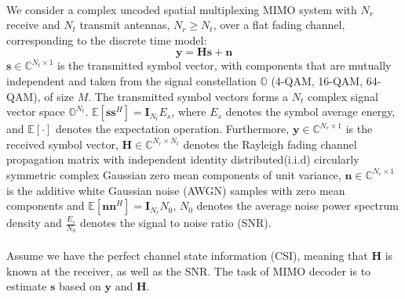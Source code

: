\documentclass[12pt,a4paper,final]{article}
\begin{document}
\begin{spacing}{2.5}
\paragraph{}We consider a complex uncoded spatial multiplexing MIMO system with $N_r$ receive and $N_t$ transmit antennas, $N_{r}\geq N_{t}$, over a flat fading channel, corresponding to the discrete time model:
\begin{equation}
\mathbf{y}=\mathbf{H}\mathbf{s}+\mathbf{n}   \label{formula 1}
\end{equation}
$\mathbf{s}\in \mathbb{C}^{N_{t}\times 1}$ is the transmitted symbol vector, with components that are mutually independent and taken from the signal constellation $\mathbb{O}$ (4-QAM, 16-QAM, 64-QAM), of size $M$. The transmitted symbol vectors forms a $N_{t}$ complex signal vector space $\mathbb{O}^{N_{t}}$. $\mathbb{E}[\mathbf{s}\mathbf{s}^{H}]=\mathbf{I}_{N_t}E_{s}$, where $E_{s}$ denotes the symbol average energy, and $\mathbb{E}[\cdot]$ denotes the expectation operation. Furthermore,  $\mathbf{y}\in \mathbb{C}^{N_{r}\times 1}$ is the received symbol vector, $\mathbf{H}\in \mathbb{C}^{N_{r}\times N_{t}}$ denotes the Rayleigh fading channel propagation matrix with independent identity distributed(i.i.d) circularly symmetric complex Gaussian zero mean components of unit variance, $\mathbf{n}\in \mathbb{C}^{N_{r}\times 1}$ is the additive white Gaussian noise (AWGN) samples with zero mean components and $\mathbb{E}[\mathbf{n}\mathbf{n}^{H}]=\mathbf{I}_{N_{r}}N_{0}$, $N_{0}$ denotes the average noise power spectrum density and $\frac{E_{s}}{N_{0}}$ denotes the signal to noise ratio (SNR). \\

\paragraph{} Assume we have the perfect channel state information (CSI), meaning that $ \mathbf{H}$ is known at the receiver, as well as the SNR. The task of MIMO decoder is to estimate $\mathbf{s}$ based on $\mathbf{y}$ and $\mathbf{H}$.


%
%


\end{spacing}
\end{document}
